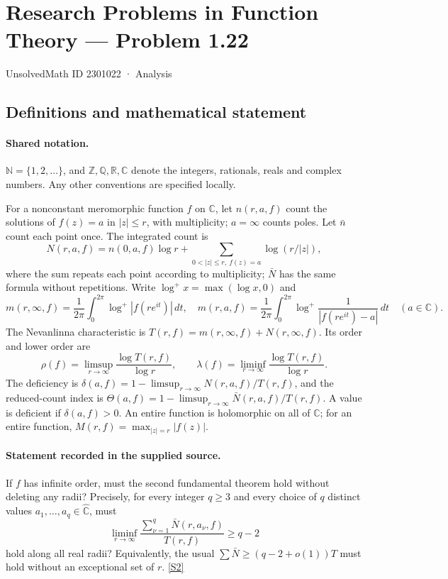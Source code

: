 \documentclass[11pt]{article}
\newcommand{\sref}[2]{\hyperlink{source:#1:#2}{[S#2]}}
\begin{document}
\setcounter{section}{2301021}
\section{Research Problems in Function Theory — Problem 1.22}\label{2301022}
{\small\sffamily UnsolvedMath ID 2301022 · Analysis}
\subsection{Definitions and mathematical statement}

\paragraph{Shared notation.}$\mathbb N=\{1,2,\ldots\}$, and $\mathbb Z,\mathbb Q,\mathbb R,\mathbb C$ denote the integers, rationals, reals and complex numbers. Any other conventions are specified locally.


For a nonconstant meromorphic function $f$ on $\mathbb C$, let $n(r,a,f)$ count the solutions of $f(z)=a$ in $|z|\le r$, with multiplicity; $a=\infty$ counts poles. Let $\bar n$ count each point once. The integrated count is
\[
 N(r,a,f)=n(0,a,f)\log r+\sum_{0<|z|\le r,\ f(z)=a}\log(r/|z|),
\]
where the sum repeats each point according to multiplicity; $\bar N$ has the same formula without repetitions. Write $\log^+x=\max(\log x,0)$ and
\[
 m(r,\infty,f)=\frac1{2\pi}\int_0^{2\pi}\log^+|f(re^{it})|\,dt,\quad
 m(r,a,f)=\frac1{2\pi}\int_0^{2\pi}\log^+\frac1{|f(re^{it})-a|}\,dt\quad(a\in\mathbb C).
\]
The Nevanlinna characteristic is $T(r,f)=m(r,\infty,f)+N(r,\infty,f)$. Its order and lower order are
\[
 \rho(f)=\limsup_{r\to\infty}\frac{\log T(r,f)}{\log r},\qquad
 \lambda(f)=\liminf_{r\to\infty}\frac{\log T(r,f)}{\log r}.
\]
The deficiency is $\delta(a,f)=1-\limsup_{r\to\infty}N(r,a,f)/T(r,f)$, and the reduced-count index is $\Theta(a,f)=1-\limsup_{r\to\infty}\bar N(r,a,f)/T(r,f)$. A value is deficient if $\delta(a,f)>0$. An entire function is holomorphic on all of $\mathbb C$; for an entire function, $M(r,f)=\max_{|z|=r}|f(z)|$.
\paragraph{Statement recorded in the supplied source.}
If $f$ has infinite order, must the second fundamental theorem hold without deleting any radii? Precisely, for every integer $q\ge3$ and every choice of $q$ distinct values $a_1,\ldots,a_q\in\widehat{\mathbb C}$, must
\[
 \liminf_{r\to\infty}\frac{\sum_{\nu=1}^{q}\bar N(r,a_\nu,f)}{T(r,f)}\ge q-2
\]
hold along all real radii? Equivalently, the usual $\sum\bar N\ge(q-2+o(1))T$ must hold without an exceptional set of $r$. \sref{2301022}{2}
\end{document}
